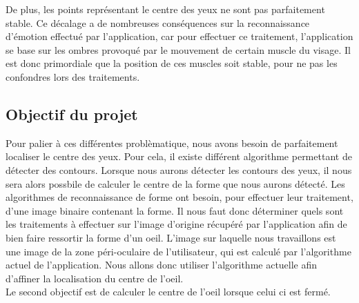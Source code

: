 De plus, les points représentant le centre des yeux ne sont pas parfaitement stable. Ce décalage a de 
nombreuses conséquences sur la reconnaissance d'émotion effectué par l'application, car pour effectuer
ce traitement, l'application se base sur les ombres provoqué par le mouvement de certain muscle du 
visage. Il est donc primordiale que la position de ces muscles soit stable, pour ne pas les confondres
lors des traitements.\\

\subsection{Objectif du projet}
Pour palier à ces différentes problèmatique, nous avons besoin de parfaitement localiser le centre des
yeux. Pour cela, il existe différent algorithme permettant de détecter des contours. Lorsque nous aurons
détecter les contours des yeux, il nous sera alors possbile de calculer le centre de la forme
que nous aurons détecté. Les algorithmes de reconnaissance de forme ont besoin, pour effectuer leur traitement,
d'une image binaire contenant la forme. Il nous faut donc déterminer quels sont les traitements à effectuer
sur l'image d'origine récupéré par l'application afin de bien faire ressortir la forme d'un oeil. L'image
sur laquelle nous travaillons est une image de la zone péri-oculaire de l'utilisateur, qui est calculé par
l'algorithme actuel de l'application. Nous allons donc utiliser l'algorithme actuelle afin d'affiner la localisation
du centre de l'oeil.\\

Le second objectif est de calculer le centre de l'oeil lorsque celui ci est fermé. 


\newpage

